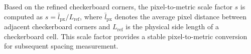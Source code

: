 \documentclass{article}
\begin{document}
Based on the refined checkerboard corners, the pixel-to-metric scale factor $s$ is computed as $s = \bar{l}_{\text{px}} / L_{\text{ref}}$, where $\bar{l}_{\text{px}}$ denotes the average pixel distance between adjacent checkerboard corners and $L_{\text{ref}}$ is the physical side length of a checkerboard cell. This scale factor provides a stable pixel-to-metric conversion for subsequent spacing measurement.




\vspace{-0.3cm}
\end{document}
